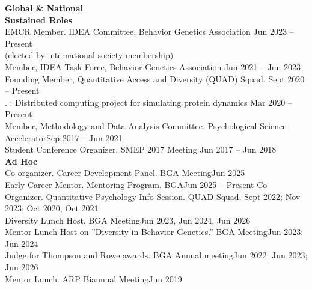 {\large \textbf{Global \& National}}\\
\textrm{\textbf{Sustained Roles}}\\
EMCR Member. IDEA Committee, Behavior Genetics Association \hfill{Jun 2023 – Present}\\ %
\hspace*{25pt}(elected by international society membership)\\
Member, IDEA Task Force, Behavior Genetics Association \hfill{Jun 2021 – Jun 2023}\\
Founding Member, Quantitative Access and Diversity (QUAD) Squad. \hfill{Sept 2020 – Present}\\%
. : Distributed computing project for simulating protein dynamics \hfill{Mar 2020 – Present}\\
Member, Methodology and Data Analysis Committee. Psychological Science Accelerator\hfill{Sep 2017 – Jun 2021}\\
Student Conference Organizer. SMEP 2017 Meeting \hfill{Jun 2017 – Jun 2018}\medskip\\
\textrm{\textbf{Ad Hoc}}\\
Co-organizer. Career Development Panel. BGA Meeting\hfill{Jun 2025}\\
Early Career Mentor. Mentoring Program. BGA\hfill{Jun 2025 – Present}\newline
Co-Organizer. Quantitative Psychology Info Session. QUAD Squad. \hfill{Sept 2022; Nov 2023;}\newline
\hspace*{0pt}\hfill{Oct 2020; Oct 2021}\\
Diversity Lunch Host. BGA Meeting\hfill{Jun 2023, Jun 2024, Jun 2026}\\%
Mentor Lunch Host on ''Diversity in Behavior Genetics.'' BGA Meeting\hfill{Jun 2023; Jun 2024}\\
Judge for Thompson and Rowe awards. BGA Annual meeting\hfill{Jun 2022; Jun 2023; Jun 2026}\\
Mentor Lunch. ARP Biannual Meeting\hfill{Jun 2019}\\

